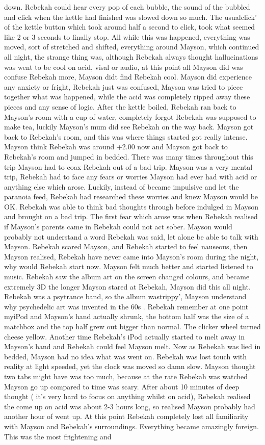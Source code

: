 \documentclass[12pt]{book}
\begin{document}
down. Rebekah could hear every pop of each bubble, the sound of the bubbled and click when the kettle had finished was slowed down so much. The usualclick' of the kettle button which took around half a second to click, took what seemed like 2 or 3 seconds to finally stop. All while this was happened, everything was moved, sort of stretched and shifted, everything around Mayson, which continued all night, the strange thing was, although Rebekah always thought hallucinations was went to be cool on acid, visal or audio, at this point all Mayson did was confuse Rebekah more, Mayson didt find Rebekah cool. Mayson did experience any anxiety or fright, Rebekah just was confused, Mayson was tried to piece together what was happened, while the acid was completely ripped away these pieces and any sense of logic. After the kettle boiled, Rebekah ran back to Mayson's room with a cup of water, completely forgot Rebekah was supposed to make tea, luckily Mayson's mum did see Rebekah on the way back. Mayson got back to Rebekah's room, and this was where things started got really intense. Mayson think Rebekah was around +2.00 now and Mayson got back to Rebekah's room and jumped in bedded. There was many times throughout this trip Mayson had to coax Rebekah out of a bad trip. Mayson was a very mental trip, Rebekah had to face any fears or worries Mayson had ever had with acid or anything else which arose. Luckily, instead of became impulsive and let the paranoia feed, Rebekah had researched these worries and knew Mayson would be OK. Rebekah was able to think bad thoughts through before indulged in Mayson and brought on a bad trip. The first fear which arose was when Rebekah realised if Mayson's parents came in Rebekah could not act sober. Mayson would probably not understand a word Rebekah was said, let alone be able to talk with Mayson. Rebekah scared Mayson, and Rebekah started to feel nauseous, then Mayson realised, Rebekah have never came into Mayson's room during the night, why would Rebekah start now. Mayson felt much better and started listened to music. Rebekah saw the album art on the screen changed colours, and became extremely 3D the longer Mayson stared at Rebekah, Mayson did this all night. Rebekah was a psytrance band, so the album wastrippy', Mayson understand why psychedelic art was invented in the 60s . Rebekah remember at one point myiPod and Mayson's hand actually shrunk, the bottom half was the size of a matchbox and the top half grew out bigger than normal. The clicker wheel turned cheese yellow. Another time Rebekah's iPod actually started to melt away in Mayson's hand and Rebekah could feel Mayson melt. Now as Rebekah was lied in bedded, Mayson had no idea what was went on. Rebekah was lost touch with reality at light speeded, yet the clock was moved so damn slow. Mayson thought two tabs might have was too much, because at the rate Rebekah was watched Mayson go up compared to time was scary. After about 10 minutes of deep thought ( it's very hard to focus on anything whilst on acid), Rebekah realised the come up on acid was about 2-3 hours long, so realised Mayson probably had another hour of went up. At this point Rebekah completely lost all familiarity with Mayson and Rebekah's surroundings. Everything became amazingly foreign. This was the most frightening and 
\end{document}
